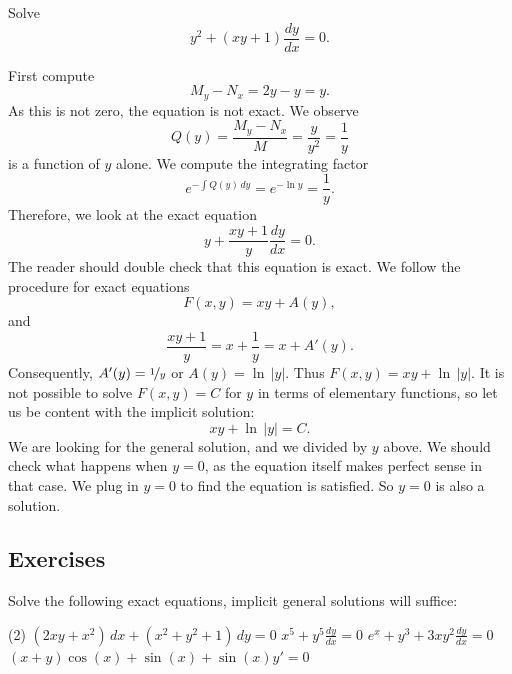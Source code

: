 \begin{example}
Solve
\begin{equation*}
y^2 + (xy+1) \frac{dy}{dx} = 0 .
\end{equation*}

First compute
\begin{equation*}
M_y-N_x = 2y-y = y .
\end{equation*}
As this is not zero, the equation is not exact.  We observe
\begin{equation*}
Q(y) = \frac{M_y-N_x}{M} = \frac{y}{y^2} = \frac{1}{y}
\end{equation*}
is a function of $y$ alone.    We compute the integrating factor
\begin{equation*}
e^{-\int  Q(y) \, dy}
=
e^{-\ln y} = \frac{1}{y} .
\end{equation*}
Therefore, we look at the exact equation
\begin{equation*}
y + \frac{xy+1}{y} \frac{dy}{dx} = 0 .
\end{equation*}
The reader should double check that this equation is exact.
We follow the procedure for exact equations
\begin{equation*}
F(x,y) = xy + A(y) ,
\end{equation*}
and
\begin{equation*}
\frac{xy+1}{y} = x+\frac{1}{y} = x+ A'(y) .
\end{equation*}
Consequently, $A'(y) = \nicefrac{1}{y}$ or $A(y) = \ln \, \lvert y \rvert$.  Thus $F(x,y)
= xy + \ln \, \lvert y \rvert$.
It is not possible to solve $F(x,y)=C$ for $y$
in terms of elementary functions, so
let us be content with the implicit solution:
\begin{equation*}
xy + \ln \, \lvert y \rvert = C .
\end{equation*}
We are looking for the general solution, and we divided by
$y$ above.  We should check what happens when $y=0$, as the equation itself
makes perfect sense in that case.  We plug in $y=0$ to find the
equation is satisfied.  So $y=0$ is also a solution.
\end{example}

\subsection{Exercises}

\begin{exercise}
Solve the following exact equations, implicit general solutions
will suffice:
\begin{tasks}(2)
\task
$(2 xy + x^2) \, dx + (x^2+y^2+1) \, dy = 0$
\task
$x^5 + y^5 \frac{dy}{dx} = 0$
\task
$e^x+y^3 + 3xy^2 \frac{dy}{dx} = 0$
\task
$(x+y)\cos(x)+\sin(x) + \sin(x)y' = 0$
\end{tasks}
\end{exercise}

